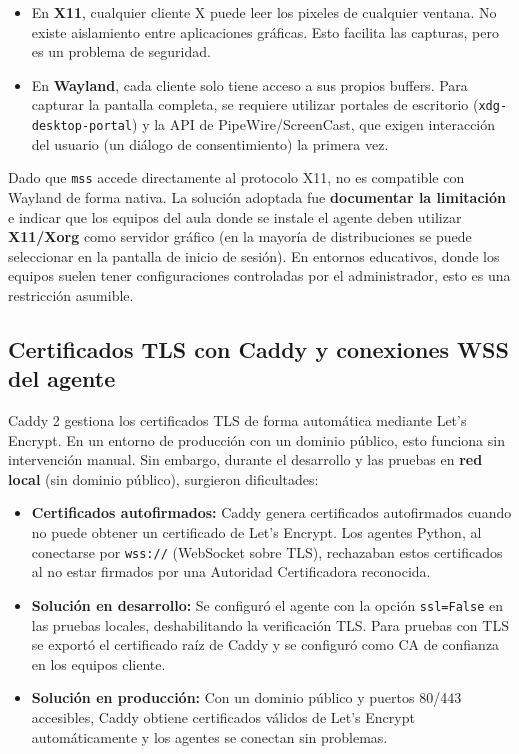 \documentclass[12pt, a4paper, twoside]{article}
\begin{document}
\begin{itemize}
  \item En \textbf{X11}, cualquier cliente X puede leer los pixeles de cualquier ventana. No existe aislamiento entre aplicaciones gráficas. Esto facilita las capturas, pero es un problema de seguridad.
  \item En \textbf{Wayland}, cada cliente solo tiene acceso a sus propios buffers. Para capturar la pantalla completa, se requiere utilizar portales de escritorio (\texttt{xdg-desktop-portal}) y la API de PipeWire/ScreenCast, que exigen interacción del usuario (un diálogo de consentimiento) la primera vez.
\end{itemize}

Dado que \texttt{mss} accede directamente al protocolo X11, no es compatible con Wayland de forma nativa. La solución adoptada fue \textbf{documentar la limitación} e indicar que los equipos del aula donde se instale el agente deben utilizar \textbf{X11/Xorg} como servidor gráfico (en la mayoría de distribuciones se puede seleccionar en la pantalla de inicio de sesión). En entornos educativos, donde los equipos suelen tener configuraciones controladas por el administrador, esto es una restricción asumible.

\subsection{Certificados TLS con Caddy y conexiones WSS del agente}

Caddy 2 gestiona los certificados TLS de forma automática mediante Let's Encrypt. En un entorno de producción con un dominio público, esto funciona sin intervención manual. Sin embargo, durante el desarrollo y las pruebas en \textbf{red local} (sin dominio público), surgieron dificultades:

\begin{itemize}
  \item \textbf{Certificados autofirmados:} Caddy genera certificados autofirmados cuando no puede obtener un certificado de Let's Encrypt. Los agentes Python, al conectarse por \texttt{wss://} (WebSocket sobre TLS), rechazaban estos certificados al no estar firmados por una Autoridad Certificadora reconocida.
  \item \textbf{Solución en desarrollo:} Se configuró el agente con la opción \texttt{ssl=False} en las pruebas locales, deshabilitando la verificación TLS. Para pruebas con TLS se exportó el certificado raíz de Caddy y se configuró como CA de confianza en los equipos cliente.
  \item \textbf{Solución en producción:} Con un dominio público y puertos 80/443 accesibles, Caddy obtiene certificados válidos de Let's Encrypt automáticamente y los agentes se conectan sin problemas.
\end{itemize}
\end{document}
